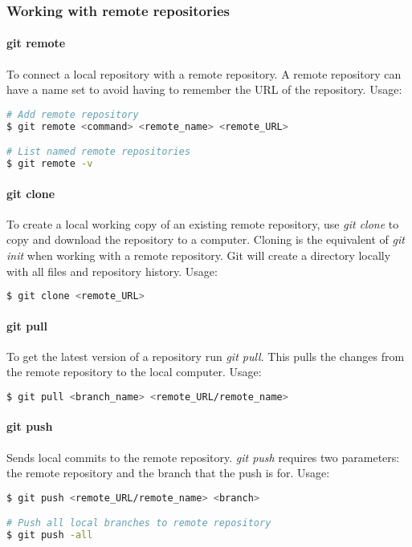 \documentclass[a4paper]{report}
\begin{document}
\subsubsection{Working with remote repositories}
\paragraph{git remote}
To connect a local repository with a remote repository. A remote repository can have a name set to avoid having to remember the URL of the repository.
Usage:
\begin{lstlisting}[language=bash]
# Add remote repository
$ git remote <command> <remote_name> <remote_URL>

# List named remote repositories
$ git remote -v
\end{lstlisting}

\paragraph{git clone}
To create a local working copy of an existing remote repository, use \emph{git clone} to copy and download the repository to a computer. Cloning is the equivalent of \emph{git init} when working with a remote repository. Git will create a directory locally with all files and repository history.
Usage:
\begin{lstlisting}[language=bash]
$ git clone <remote_URL>
\end{lstlisting}

\paragraph{git pull}
To get the latest version of a repository run \emph{git pull}. This pulls the changes from the remote repository to the local computer.
Usage:
\begin{lstlisting}[language=bash]
$ git pull <branch_name> <remote_URL/remote_name>
\end{lstlisting}


\paragraph{git push}
Sends local commits to the remote repository. \emph{git push} requires two parameters: the remote repository and the branch that the push is for.
Usage:
\begin{lstlisting}[language=bash]
$ git push <remote_URL/remote_name> <branch>

# Push all local branches to remote repository
$ git push -all
\end{lstlisting}
\end{document}
